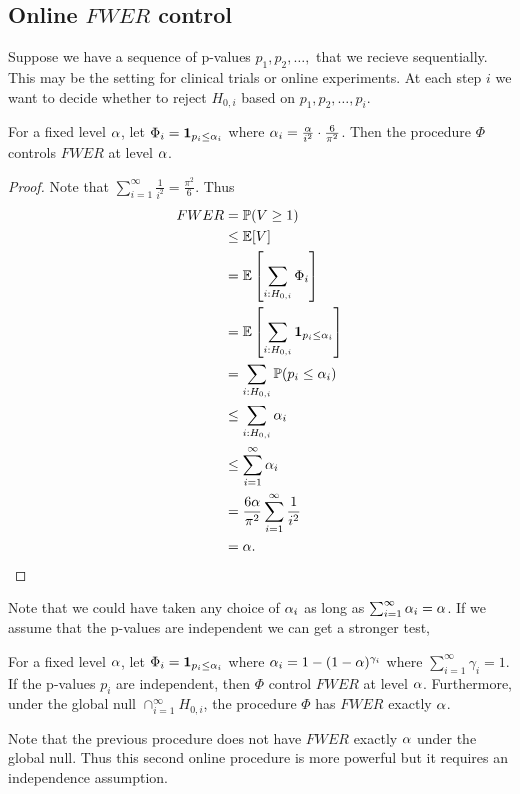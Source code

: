 \subsection{Online $FWER$ control}
Suppose we have a sequence of p-values $p_1,p_2,\ldots,$ that we recieve sequentially. This may be the setting for clinical trials or online experiments. At each step $i$ we want to decide whether to reject $H_{0,i}$ based on $p_1,p_2,\ldots,p_i$.
\begin{prop}
    For a fixed level ${\alpha}$, let $\Phi_i = {{\bf 1}}_{p_i \le {\alpha}_i}$ where ${\alpha}_i = \frac{{\alpha}}{i^2}\cdot \frac{6}{\pi^2}$. Then the procedure $\Phi$ controls $FWER$ at level ${\alpha}$.
\end{prop}
\begin{proof}
    Note that $\sum_{i=1}^\infty \frac{1}{i^2}=\frac{\pi^2}{6}$. Thus
    \begin{align*}
        FWER &= {\mathbb{P}}(V \ge 1)\\
        &\le {\mathbb{E}}[V]\\
        &={\mathbb{E}}\left[\sum_{i:H_{0,i}}\Phi_i\right]\\
        &={\mathbb{E}}\left[\sum_{i:H_{0,i}}{{\bf 1}}_{p_i\le{\alpha}_i}\right]\\
        &=\sum_{i:H_{0,i}}{\mathbb{P}}(p_i\le {\alpha}_i)\\
        &\le \sum_{i : H_{0,i}}{\alpha}_i\\
        &\le \sum_{i=1}^\infty {\alpha}_i\\
        &= \frac{6 {\alpha}}{\pi^2}\sum_{i=1}^\infty \frac{1}{i^2}\\
        &={\alpha}.\qedhere
    \end{align*}
\end{proof}
Note that we could have taken any choice of ${\alpha}_i$ as long as $\sum_{i=1}^\infty {\alpha}_i={\alpha}$. If we assume that the p-values are independent we can get a stronger test,
\begin{prop}
    For a fixed level ${\alpha}$, let $\Phi_i = {{\bf 1}}_{p_i \le {\alpha}_i}$ where ${\alpha}_i = 1-(1-{\alpha})^{\gamma_i}$ where $\sum_{i=1}^\infty \gamma_i = 1$. If the p-values $p_i$ are independent, then $\Phi$ control $FWER$ at level ${\alpha}$. Furthermore, under the global null $\cap_{i=1}^\infty H_{0,i}$, the procedure $\Phi$ has $FWER$ exactly ${\alpha}$.
\end{prop}
Note that the previous procedure does not have $FWER$ exactly ${\alpha}$ under the global null. Thus this second online procedure is more powerful but it requires an independence assumption.
